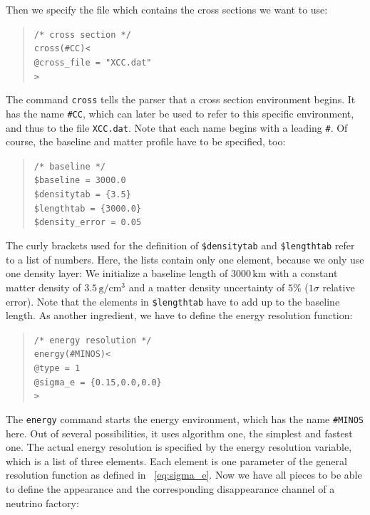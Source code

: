 Then we specify the file which contains the cross sections we want to 
use:
\begin{quote}
{\tt /* cross section */}\\
{\tt cross(\#CC)<}\\
{\tt \tb @cross\_file = "XCC.dat"}\\
{\tt >}
\end{quote}
The command {\tt cross} tells the parser that a cross section environment
begins. It has the name {\tt \#CC}, which can later be used to refer 
to this specific environment, and thus to the file {\tt XCC.dat}. Note that each name begins with a leading {\tt \#}.
%
Of course, the baseline and matter profile have to be specified, too:
\begin{quote}
{\tt /* baseline */}\\
{\tt \$baseline = 3000.0}\\
{\tt \$densitytab = \{3.5\}}\\
{\tt \$lengthtab = \{3000.0\}}\\
{\tt \$density\_error = 0.05}
\end{quote}
The curly brackets used for the definition of {\tt \$densitytab} and
{\tt \$lengthtab} refer to a list of numbers. Here, the lists contain only
one element, because we only use one density layer: We initialize a baseline length of $3000 \, \mathrm{km}$ with a constant matter density of $3.5 \, \mathrm{g/cm^3}$ and a matter density uncertainty of $5\%$ ($1 \sigma$ relative error). Note that the elements in {\tt \$lengthtab} have to add up to the baseline length. 
%
As another ingredient, we have to define the energy resolution function:
\begin{quote}
{\tt /* energy resolution */}\\
{\tt energy(\#MINOS)<}\\
{\tt \tb @type = 1}\\
{\tt \tb @sigma\_e = \{0.15,0.0,0.0\}}\\
{\tt >}
\end{quote}
The {\tt energy} command starts the energy environment, which has the name 
{\tt \#MINOS} here. Out of several possibilities, it uses algorithm one,
the simplest and fastest one. The actual energy resolution is specified
by the energy resolution variable, which is a list of three elements. Each 
element is one parameter of the general resolution function as defined in 
\eq~\ref{eq:sigma_e}.
%
Now we have all pieces to be able to define the appearance and the corresponding disappearance channel of a neutrino factory: 
